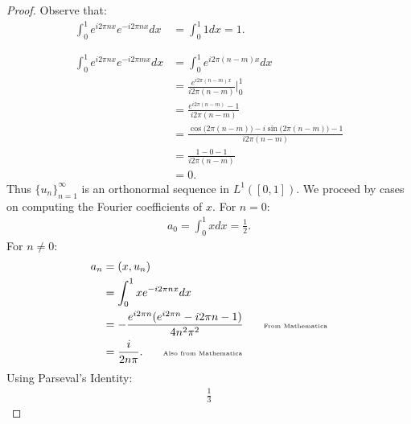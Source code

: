 \documentclass[10pt,oneside,openany]{memoir}
\begin{document}
    \begin{proof}
        Observe that:
            \begin{equation*}
            \begin{split}
                \int_{0}^{1} e^{i 2 \pi n x}e^{-i 2 \pi n x}dx 
                & = \int_{0}^{1} 1 dx = 1. \\
                &\phantom{a} \\
                \int_{0}^{1} e^{i 2 \pi n x}e^{-i 2 \pi m x}dx
                & = \int_{0}^{1} e^{i 2 \pi (n-m)x}dx \\
                & = \frac{e^{i 2 \pi (n-m)x}}{i 2 \pi (n-m)}\Bigg|_0^1 \\
                & = \frac{e^{i 2 \pi (n-m)} - 1}{i 2 \pi (n-m)} \\
                & = \frac{\cos\bigl(2\pi(n-m)\bigr) - i\sin\bigl(2 \pi (n-m)\bigr) - 1}{i 2 \pi (n-m)} \\
                & = \frac{1 - 0 - 1}{i 2 \pi (n-m)} \\
                & = 0.
            \end{split}
            \end{equation*}
        Thus $\{u_n\}_{n = 1}^\infty$ is an orthonormal sequence in $L^1([0,1])$. We proceed by cases on computing the Fourier coefficients of $x$. For $n = 0$:
            \begin{equation*}
            \begin{split}
                a_0 = \int_0^1 x dx = \frac{1}{2}.
            \end{split}
            \end{equation*}
        For $n \neq 0$:
            \begin{equation*}
            \begin{split}
                a_n 
                & = (x,u_n) \\
                & = \int_0^1 x e^{-i 2 \pi n x}dx \\
                & = -\frac{e^{i 2 \pi n}(e^{i 2 \pi n} - i 2 \pi n - 1)}{4 n^2 \pi ^2} \h9\h9\text{\tiny From Mathematica} \\
                & = \frac{i}{2n \pi}. \h9\h9\text{\tiny Also from Mathematica}
            \end{split}
            \end{equation*}
        Using Parseval's Identity:
            \begin{equation*}
            \begin{split}
                \frac{1}{3}

\end{split}
\end{equation*}
\end{proof}
\end{document}
